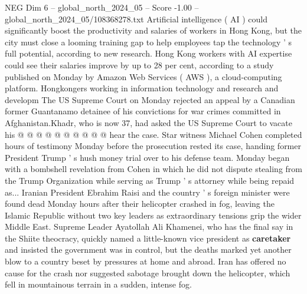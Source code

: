 \begin{textsample}{NEG Dim 6 – global\_north\_2024\_05 – Score -1.00 – global\_north\_2024\_05/108368278.txt}
Artificial intelligence ( AI ) could significantly boost the productivity and salaries of workers in Hong Kong, but the city must close a looming training gap to help employees tap the technology ' s full potential, according to new research.
Hong Kong workers with AI expertise could see their salaries improve by up to 28 per cent, according to a study published on Monday by Amazon Web Services ( AWS ), a cloud-computing platform.
Hongkongers working in information technology and research and developm The US Supreme Court on Monday rejected an appeal by a Canadian former Guantanamo detainee of his convictions for war crimes committed in Afghanistan.Khadr, who is now 37, had asked the US Supreme Court to vacate his @ @ @ @ @ @ @ @ @ @ hear the case.
Star witness Michael Cohen completed hours of testimony Monday before the prosecution rested its case, handing former President Trump ' s hush money trial over to his defense team.
Monday began with a bombshell revelation from Cohen in which he did not dispute stealing from the Trump Organization while serving as Trump ' s attorney while being repaid as...
Iranian President Ebrahim Raisi and the country ' s foreign minister were found dead Monday hours after their helicopter crashed in fog, leaving the Islamic Republic without two key leaders as extraordinary tensions grip the wider Middle East.
Supreme Leader Ayatollah Ali Khamenei, who has the final say in the Shiite theocracy, quickly named a little-known vice president as \textbf{caretaker} and insisted the government was in control, but the deaths marked yet another blow to a country beset by pressures at home and abroad.
Iran has offered no cause for the crash nor suggested sabotage brought down the helicopter, which fell in mountainous terrain in a sudden, intense fog.

\end{textsample}
